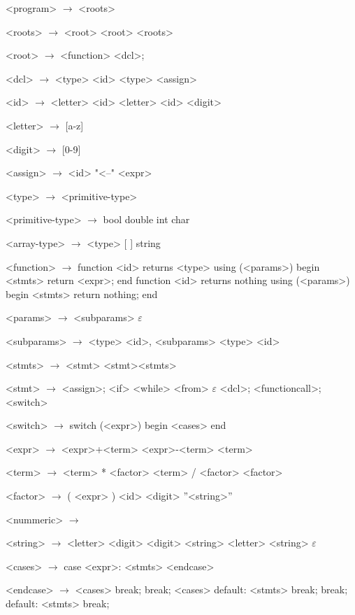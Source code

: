 


\begin{grammar}
<program> $\rightarrow$ <roots>

<roots> $\rightarrow$ <root>
\alt <root> <roots>

<root> $\rightarrow$ <function>
\alt <dcl>;

<dcl> $\rightarrow$ <type> <id>
\alt <type> <assign>

<id> $\rightarrow$ <letter>
	\alt<id> <letter>
	\alt<id> <digit>

<letter> $\rightarrow$ [a-z]
	\alt [A-Z]

<digit> $\rightarrow$ [0-9]

<assign>  $\rightarrow$ <id> "<--" <expr>

<type> $\rightarrow$ <primitive-type>

<primitive-type> $\rightarrow$ bool
\alt double
\alt int
\alt char

<array-type> $\rightarrow$ <type> [ ]
\alt string

<function> $\rightarrow$  function <id> returns <type> using (<params>)
begin
	<stmts>
	return <expr>;
end
\alt function <id> returns nothing using (<params>)
begin
	<stmts>
	return nothing;
end

<params> $\rightarrow$ <subparams>
	\alt $\varepsilon$

<subparams> $\rightarrow$ <type> <id>, <subparams>
\alt <type> <id>

<stmts> $\rightarrow$ <stmt>
	\alt <stmt><stmts>

<stmt> $\rightarrow$ <assign>;
	\alt <if>
	\alt <while>
	\alt <from>
	\alt $\varepsilon$
	\alt <dcl>;
	\alt <functioncall>;
	\alt <switch>

<switch> $\rightarrow$ switch (<expr>)
		begin
			<cases>
		end

<expr> $\rightarrow$ <expr>+<term>
	\alt<expr>-<term>
	\alt<term>

<term> $\rightarrow$ <term> * <factor>
	\alt <term> / <factor>
	\alt <factor>

<factor> $\rightarrow$ ( <expr> )
	\alt <id>
	\alt <digit>
	\alt ''<string>''

<nummeric> $\rightarrow$

<string> $\rightarrow$ <letter>
\alt <digit>
\alt <digit> <string>
\alt <letter> <string>
\alt $\varepsilon$

<cases> $\rightarrow$ case <expr>:
			<stmts>
		<endcase>
		
<endcase> $\rightarrow$ <cases>
		\alt break;
		\alt break;
		<cases>
		\alt default:
			<stmts>
			break;
		\alt break;
		default:
			<stmts>
			break;


\end{grammar}
